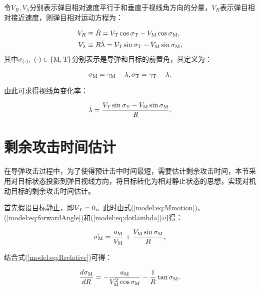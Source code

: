 令$V_R,V_{\lambda}$分别表示弹目相对速度平行于和垂直于视线角方向的分量，$V_R$表示弹目相对接近速度，则弹目相对运动方程为：

\begin{align}
	\label{model:eq:Rrelative} V_R & \equiv \dot{R}=V_{\text T}\cos{\sigma_{\text T}}-V_{\text M}\cos{\sigma_{\text M}},\\
	\label{model:eq:Lrelative} V_{\lambda} & \equiv R\dot{\lambda} = V_{\text T}\sin{\sigma_{\text T}}-V_{\text M}\sin{\sigma_{\text M}},
\end{align}
其中$\sigma_{(\cdot)},\ (\cdot) \in \{\text M,\text T\}$分别表示是导弹和目标的前置角，其定义为：

\begin{equation}
\label{model:eq:forwardAngle}
	\sigma_{\text M} = \gamma_{\text M}-\lambda,\quad \sigma_{\text T}=\gamma_{\text T}-\lambda.
\end{equation}

由此可求得视线角变化率：

\begin{equation}
\label{model:eq:dotlambda}
	\dot \lambda = \frac{V_{\text T}\sin{\sigma_{\text T}}-V_{\text M}\sin{\sigma_{\text M}}}{R}.
\end{equation}


\section{剩余攻击时间估计}
\label{model:sec:time}

在导弹攻击过程中，为了使得预计击中时间最短，需要估计剩余攻击时间，本节采用对目标状态投影到弹目视线方向，将目标转化为相对静止状态的思想，实现对机动目标的剩余攻击时间估计。

首先假设目标静止，即$V_{\text T}=0$。此时由式(\ref{model:eq:Mmotion})、(\ref{model:eq:forwardAngle})和(\ref{model:eq:dotlambda})可得：

\begin{equation}
\label{model:eq:dotsigma}
	\dot{\sigma_{\text M}}=\frac{a_{\text M}}{V_{\text M}}+\frac{V_{\text M}\sin{\sigma_{\text M}}}{R},
\end{equation}

结合式(\ref{model:eq:Rrelative})可得：

\begin{equation}
\label{model:eq:sigmaDotR}
	\frac{d\sigma_{\text M}}{dR} = -\frac{a_{\text M}}{V_{\text M}^2\cos{\sigma_{\text M}}}-\frac{1}{R}\tan{\sigma_{\text M}}.
\end{equation}

